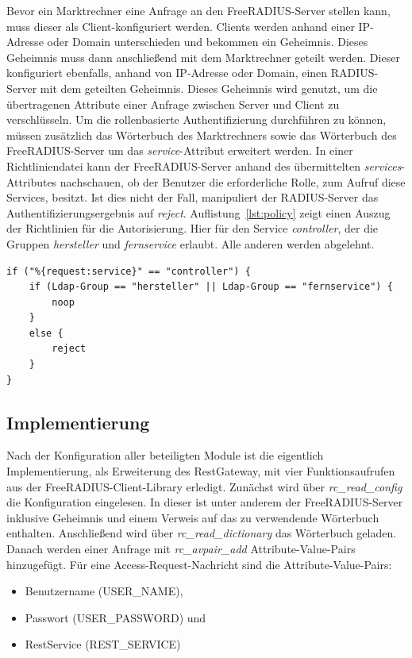 \documentclass[11pt,a4paper]{report}
\begin{document}
Bevor ein Marktrechner eine Anfrage an den FreeRADIUS-Server stellen kann, muss dieser als Client-konfiguriert werden. Clients werden anhand einer IP-Adresse oder Domain unterschieden und bekommen ein Geheimnis. Dieses Geheimnis muss dann anschließend mit dem Marktrechner geteilt werden. Dieser konfiguriert ebenfalls, anhand von IP-Adresse oder Domain, einen RADIUS-Server mit dem geteilten Geheimnis. Dieses Geheimnis wird genutzt, um die übertragenen Attribute einer Anfrage zwischen Server und Client zu verschlüsseln. Um die rollenbasierte Authentifizierung durchführen zu können, müssen zusätzlich das Wörterbuch des Marktrechners sowie das Wörterbuch des FreeRADIUS-Server um das \textit{service}-Attribut erweitert werden. In einer Richtliniendatei kann der FreeRADIUS-Server anhand des übermittelten \textit{services}-Attributes nachschauen, ob der Benutzer die erforderliche Rolle, zum Aufruf diese Services, besitzt. Ist dies nicht der Fall, manipuliert der RADIUS-Server das Authentifizierungsergebnis auf \textit{reject}. Auflistung~\ref{lst:policy} zeigt einen Auszug der Richtlinien für die Autorisierung. Hier für den Service \textit{controller}, der die Gruppen \textit{hersteller} und \textit{fernservice} erlaubt. Alle anderen werden abgelehnt.

\begin{lstlisting}[caption=Richtlinie für den controller-Service, label=lst:policy]
if ("%{request:service}" == "controller") {
    if (Ldap-Group == "hersteller" || Ldap-Group == "fernservice") {
        noop
    }
    else {
        reject
    }
}
\end{lstlisting}

\subsection{Implementierung}

Nach der Konfiguration aller beteiligten Module ist die eigentlich Implementierung, als Erweiterung des RestGateway, mit vier Funktionsaufrufen aus der FreeRADIUS-Client-Library erledigt. Zunächst wird über \textit{rc\_read\_config} die Konfiguration eingelesen. In dieser ist unter anderem der FreeRADIUS-Server inklusive Geheimnis und einem Verweis auf das zu verwendende Wörterbuch enthalten. Anschließend wird über \textit{rc\_read\_dictionary} das Wörterbuch geladen. Danach werden einer Anfrage mit \textit{rc\_avpair\_add} Attribute-Value-Pairs hinzugefügt. Für eine Access-Request-Nachricht sind die Attribute-Value-Pairs:

\begin{itemize}
\item Benutzername (USER\_NAME),
\item Passwort (USER\_PASSWORD) und
\item RestService (REST\_SERVICE)
\end{itemize}
\end{document}
